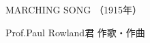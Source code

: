 \documentclass[10pt,b5j]{tarticle} %
\begin{document}
\begin{minipage}[c]{0.7\hsize} %
    \begin{center}
        {\LARGE
            MARCHING SONG %
        }
        {\small 
            （1915年） %
        }
    \end{center}
\end{minipage}
\begin{minipage}[c]{0.3\hsize} %
    \begin{flushright} %
        Prof.Paul Rowland君 作歌・作曲 %
    \end{flushright}
\end{minipage}
\end{document}
